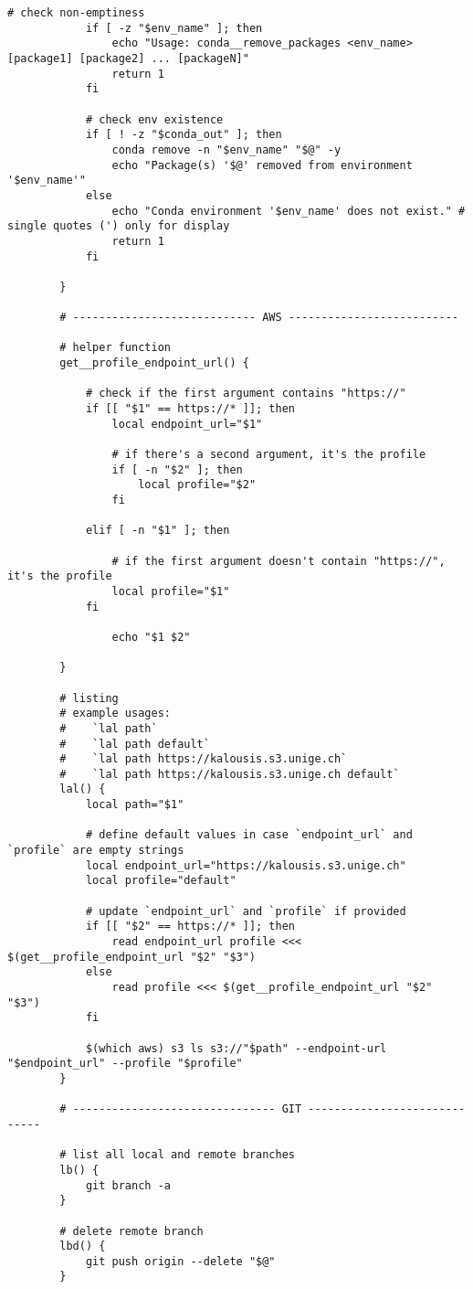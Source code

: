 \documentclass[12pt, a4paper]{article}
\numberwithin{equation}{section}
\theoremstyle{definition}
\theoremstyle{definition}
\begin{document}
\begin{lstlisting}[style=mystylebash, label=alg:bashrc_contents, caption=Contents of .bashrc file, xleftmargin=\parindent]
			# check non-emptiness
			if [ -z "$env_name" ]; then
				echo "Usage: conda__remove_packages <env_name> [package1] [package2] ... [packageN]"
				return 1
			fi 
			
			# check env existence
			if [ ! -z "$conda_out" ]; then
				conda remove -n "$env_name" "$@" -y
				echo "Package(s) '$@' removed from environment '$env_name'"
			else
				echo "Conda environment '$env_name' does not exist." # single quotes (') only for display
				return 1	
			fi
			
		}
	
		# ---------------------------- AWS --------------------------
		
		# helper function
		get__profile_endpoint_url() {
			
			# check if the first argument contains "https://"                                       
			if [[ "$1" == https://* ]]; then
				local endpoint_url="$1"
			
				# if there's a second argument, it's the profile
				if [ -n "$2" ]; then
					local profile="$2"
				fi
			
			elif [ -n "$1" ]; then
			
				# if the first argument doesn't contain "https://", it's the profile
				local profile="$1"
			fi
				
				echo "$1 $2"
			
		}
		
		# listing
		# example usages:
		#    `lal path`
		#    `lal path default`
		#    `lal path https://kalousis.s3.unige.ch`
		#    `lal path https://kalousis.s3.unige.ch default`
		lal() {
			local path="$1"
			
			# define default values in case `endpoint_url` and `profile` are empty strings
			local endpoint_url="https://kalousis.s3.unige.ch"
			local profile="default"
			
			# update `endpoint_url` and `profile` if provided
			if [[ "$2" == https://* ]]; then
				read endpoint_url profile <<< $(get__profile_endpoint_url "$2" "$3")
			else 
				read profile <<< $(get__profile_endpoint_url "$2" "$3")
			fi
			
			$(which aws) s3 ls s3://"$path" --endpoint-url "$endpoint_url" --profile "$profile"
		}
		
		# ------------------------------- GIT -----------------------------
		
		# list all local and remote branches
		lb() {
			git branch -a
		}

		# delete remote branch
		lbd() {
			git push origin --delete "$@"
		}
		

\end{lstlisting}
\end{document}
